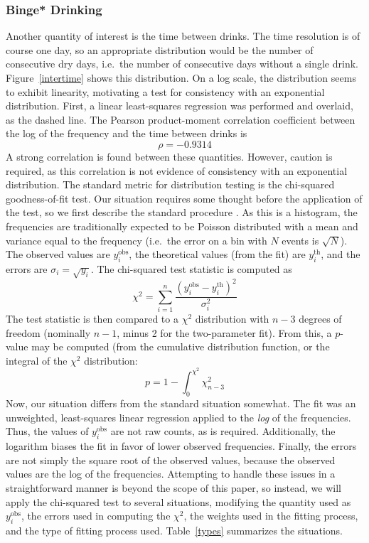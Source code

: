 \documentclass{article}
\begin{document}
\begin{multicols}{2}
	\subsubsection*{Binge* Drinking}
	Another quantity of interest is the time between drinks. The time resolution is of course one day, so an appropriate distribution would be the number of consecutive dry days, i.e.\ the number of consecutive days without a single drink. Figure~\ref{intertime} shows this distribution. On a log scale, the distribution seems to exhibit linearity, motivating a test for consistency with an exponential distribution. First, a linear least-squares regression was performed and overlaid, as the dashed line. The Pearson product-moment correlation coefficient \cite{lyons-cc} between the log of the frequency and the time between drinks is 
	$$\rho = -0.9314$$
	A strong correlation is found between these quantities. However, caution is required, as this correlation is not evidence of consistency with an exponential distribution. The standard metric for distribution testing is the chi-squared goodness-of-fit test. Our situation requires some thought before the application of the test, so we first describe the standard procedure \cite{lyons-chi}. As this is a histogram, the frequencies are traditionally expected to be Poisson distributed with a mean and variance equal to the frequency (i.e.\ the error on a bin with $N$ events is $\sqrt{N}$). The observed values are $y_i^\text{obs}$, the theoretical values (from the fit) are $y_i^\text{th}$, and the errors are $\sigma_i = \sqrt{y_i}$. The chi-squared test statistic is computed as
	$$\chi^2 = \sum_{i=1}^n{\frac{\left(y_i^\text{obs} - y_i^\text{th}\right)^2}{\sigma_i^2}}$$
	The test statistic is then compared to a $\chi^2$ distribution with $n-3$ degrees of freedom (nominally $n-1$, minus 2 for the two-parameter fit). From this, a $p$-value may be computed (from the cumulative distribution function, or the integral of the $\chi^2$ distribution:
	$$p = 1 - \int_0^{\chi^2}{\chi^2_{n-3}}$$
	Now, our situation differs from the standard situation somewhat. The fit was an unweighted, least-squares linear regression applied to the \emph{log} of the frequencies. Thus, the values of $y_i^\text{obs}$ are not raw counts, as is required. Additionally, the logarithm biases the fit in favor of lower observed frequencies. Finally, the errors are not simply the square root of the observed values, because the observed values are the log of the frequencies. Attempting to handle these issues in a straightforward manner is beyond the scope of this paper, so instead, we will apply the chi-squared test to several situations, modifying the quantity used as $y_i^\text{obs}$, the errors used in computing the $\chi^2$, the weights used in the fitting process, and the type of fitting process used. Table~\ref{types} summarizes the situations.


\end{multicols}
\end{document}
